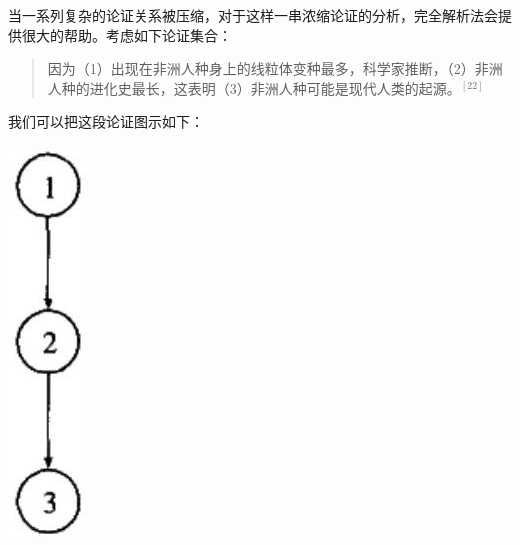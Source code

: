 当一系列复杂的论证关系被压缩，对于这样一串浓缩论证的分析，完全解析法会提供很大的帮助。考虑如下论证集合：

\begin{quotation}
因为（1）出现在非洲人种身上的线粒体变种最多，科学家推断，（2）非洲人种的进化史最长，这表明（3）非洲人种可能是现代人类的起源。${}^{[22]}$
\end{quotation}

我们可以把这段论证图示如下：

\begin{center}
\includegraphics[width=\textwidth]{images/2025_05_15_6a28331d5e7c993ad07ag-034.jpg}
\end{center}

